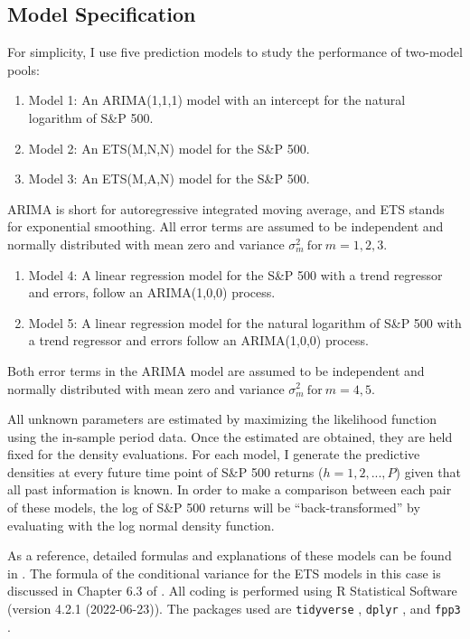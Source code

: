 \documentclass{monashthesis}
\begin{document}
\hypertarget{model}{%
\subsection{Model Specification}\label{model}}

For simplicity, I use five prediction models to study the performance of two-model pools:

\begin{enumerate}
\def\labelenumi{\arabic{enumi}.}
\tightlist
\item
  Model 1: An ARIMA(1,1,1) model with an intercept for the natural logarithm of S\&P 500.
\item
  Model 2: An ETS(M,N,N) model for the S\&P 500.
\item
  Model 3: An ETS(M,A,N) model for the S\&P 500.
\end{enumerate}

ARIMA is short for autoregressive integrated moving average, and ETS stands for exponential smoothing. All error terms are assumed to be independent and normally distributed with mean zero and variance \(\sigma_m^2 \ \text{for}\  m = 1,2,3\).

\begin{enumerate}
\def\labelenumi{\arabic{enumi}.}
\setcounter{enumi}{3}
\tightlist
\item
  Model 4: A linear regression model for the S\&P 500 with a trend regressor and errors, follow an ARIMA(1,0,0) process.
\item
  Model 5: A linear regression model for the natural logarithm of S\&P 500 with a trend regressor and errors follow an ARIMA(1,0,0) process.
\end{enumerate}

Both error terms in the ARIMA model are assumed to be independent and normally distributed with mean zero and variance \(\sigma_m^2 \ \text{for}\  m = 4,5\).

All unknown parameters are estimated by maximizing the likelihood function using the in-sample period data. Once the estimated are obtained, they are held fixed for the density evaluations. For each model, I generate the predictive densities at every future time point of S\&P 500 returns (\(h=1,2,...,P\)) given that all past information is known. In order to make a comparison between each pair of these models, the log of S\&P 500 returns will be ``back-transformed'' by evaluating with the log normal density function.

As a reference, detailed formulas and explanations of these models can be found in \textcite{fpp3}. The formula of the conditional variance for the ETS models in this case is discussed in Chapter 6.3 of \textcite{HKOS08}. All coding is performed using R Statistical Software (version 4.2.1 (2022-06-23)). The packages used are \texttt{tidyverse} \autocite{tidy19}, \texttt{dplyr} \autocite{dplyr23}, and \texttt{fpp3} \autocite{fpp23}.
\end{document}
